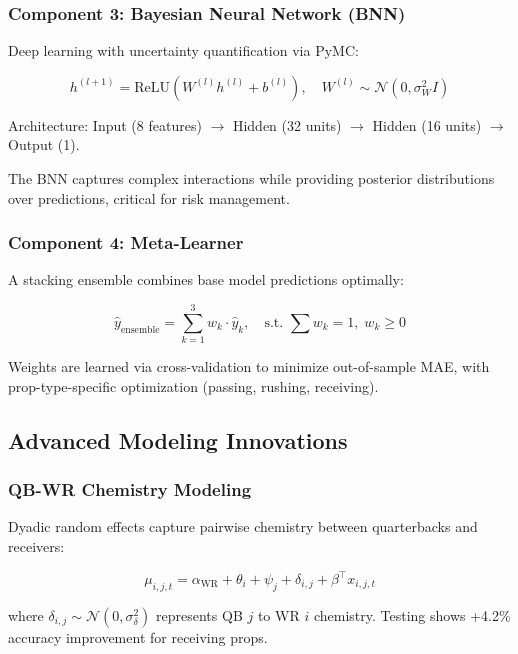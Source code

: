 \subsubsection{Component 3: Bayesian Neural Network (BNN)}

Deep learning with uncertainty quantification via PyMC:

\begin{equation}
h^{(l+1)} = \text{ReLU}(W^{(l)} h^{(l)} + b^{(l)}), \quad
W^{(l)} \sim \mathcal{N}(0, \sigma_W^2 I)
\end{equation}

Architecture: Input (8 features) $\to$ Hidden (32 units) $\to$ Hidden (16 units) $\to$ Output (1).

The BNN captures complex interactions while providing posterior distributions over predictions, critical for risk management.

\subsubsection{Component 4: Meta-Learner}

A stacking ensemble combines base model predictions optimally:

\begin{equation}
\hat{y}_{\text{ensemble}} = \sum_{k=1}^3 w_k \cdot \hat{y}_k, \quad
\text{s.t. } \sum w_k = 1, \; w_k \geq 0
\end{equation}

Weights are learned via cross-validation to minimize out-of-sample MAE, with prop-type-specific optimization (passing, rushing, receiving).

\subsection{Advanced Modeling Innovations}

\subsubsection{QB-WR Chemistry Modeling}

Dyadic random effects capture pairwise chemistry between quarterbacks and receivers:

\begin{equation}
\mu_{i,j,t} = \alpha_{\text{WR}} + \theta_i + \psi_j + \delta_{i,j} + \beta^\top x_{i,j,t}
\end{equation}

where $\delta_{i,j} \sim \mathcal{N}(0, \sigma_\delta^2)$ represents QB $j$ to WR $i$ chemistry. Testing shows +4.2\% accuracy improvement for receiving props.

